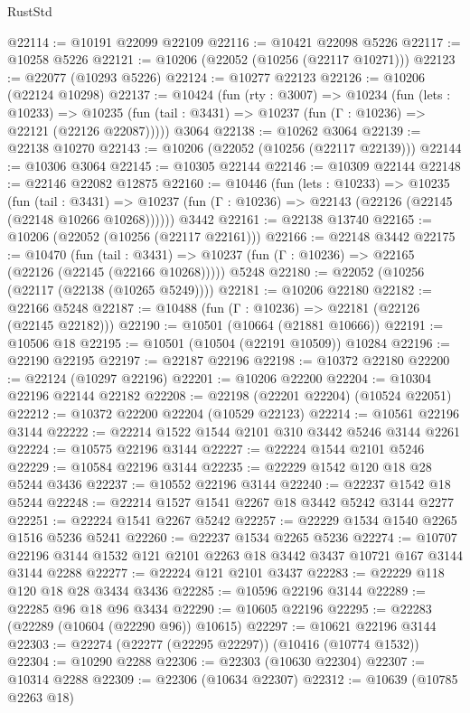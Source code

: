 \begin{lexlean}{RustStd}
\begin{coremodule}
@22114 := @10191 @22099 @22109
@22116 := @10421 @22098 @5226
@22117 := @10258 @5226
@22121 := @10206 (@22052 (@10256 (@22117 @10271)))
@22123 := @22077 (@10293 @5226)
@22124 := @10277 @22123
@22126 := @10206 (@22124 @10298)
@22137 := @10424
    (fun (rty : @3007) =>
    @10234
      (fun (lets : @10233) =>
      @10235 (fun (tail : @3431) => @10237 (fun (Γ : @10236) => @22121 (@22126 @22087)))))
    @3064
@22138 := @10262 @3064
@22139 := @22138 @10270
@22143 := @10206 (@22052 (@10256 (@22117 @22139)))
@22144 := @10306 @3064
@22145 := @10305 @22144
@22146 := @10309 @22144
@22148 := @22146 @22082 @12875
@22160 := @10446
    (fun (lets : @10233) =>
    @10235
      (fun (tail : @3431) =>
      @10237 (fun (Γ : @10236) => @22143 (@22126 (@22145 (@22148 @10266 @10268))))))
    @3442
@22161 := @22138 @13740
@22165 := @10206 (@22052 (@10256 (@22117 @22161)))
@22166 := @22148 @3442
@22175 := @10470
    (fun (tail : @3431) => @10237 (fun (Γ : @10236) => @22165 (@22126 (@22145 (@22166 @10268)))))
    @5248
@22180 := @22052 (@10256 (@22117 (@22138 (@10265 @5249))))
@22181 := @10206 @22180
@22182 := @22166 @5248
@22187 := @10488 (fun (Γ : @10236) => @22181 (@22126 (@22145 @22182)))
@22190 := @10501 (@10664 (@21881 @10666))
@22191 := @10506 @18
@22195 := @10501 (@10504 (@22191 @10509)) @10284
@22196 := @22190 @22195
@22197 := @22187 @22196
@22198 := @10372 @22180
@22200 := @22124 (@10297 @22196)
@22201 := @10206 @22200
@22204 := @10304 @22196 @22144 @22182
@22208 := @22198 (@22201 @22204) (@10524 @22051)
@22212 := @10372 @22200 @22204 (@10529 @22123)
@22214 := @10561 @22196 @3144
@22222 := @22214 @1522 @1544 @2101 @310 @3442 @5246 @3144 @2261
@22224 := @10575 @22196 @3144
@22227 := @22224 @1544 @2101 @5246
@22229 := @10584 @22196 @3144
@22235 := @22229 @1542 @120 @18 @28 @5244 @3436
@22237 := @10552 @22196 @3144
@22240 := @22237 @1542 @18 @5244
@22248 := @22214 @1527 @1541 @2267 @18 @3442 @5242 @3144 @2277
@22251 := @22224 @1541 @2267 @5242
@22257 := @22229 @1534 @1540 @2265 @1516 @5236 @5241
@22260 := @22237 @1534 @2265 @5236
@22274 := @10707 @22196 @3144 @1532 @121 @2101 @2263 @18 @3442 @3437 @10721 @167 @3144 @3144 @2288
@22277 := @22224 @121 @2101 @3437
@22283 := @22229 @118 @120 @18 @28 @3434 @3436
@22285 := @10596 @22196 @3144
@22289 := @22285 @96 @18 @96 @3434
@22290 := @10605 @22196
@22295 := @22283 (@22289 (@10604 (@22290 @96)) @10615)
@22297 := @10621 @22196 @3144
@22303 := @22274 (@22277 (@22295 @22297)) (@10416 (@10774 @1532))
@22304 := @10290 @2288
@22306 := @22303 (@10630 @22304)
@22307 := @10314 @2288
@22309 := @22306 (@10634 @22307)
@22312 := @10639 (@10785 @2263 @18)

\end{coremodule}
\end{lexlean}
